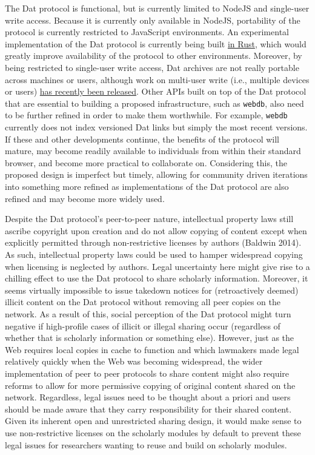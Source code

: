 \documentclass[a4paper]{article}
\begin{document}
The Dat protocol is functional, but is currently limited to NodeJS and
single-user write access. Because it is currently only available in
NodeJS, portability of the protocol is currently restricted to
JavaScript environments. An experimental implementation of the Dat
protocol is currently being built \href{https://github.com/datrs}{in
Rust}, which would greatly improve availability of the protocol to other
environments. Moreover, by being restricted to single-user write access,
Dat archives are not really portable across machines or users, although
work on multi-user write (i.e., multiple devices or users)
\href{https://github.com/mafintosh/hyperdb}{has recently been released}.
Other APIs built on top of the Dat protocol that are essential to
building a proposed infrastructure, such as \texttt{webdb}, also need to
be further refined in order to make them worthwhile. For example,
\texttt{webdb} currently does not index versioned Dat links but simply
the most recent versions. If these and other developments continue, the
benefits of the protocol will mature, may become readily available to
individuals from within their standard browser, and become more
practical to collaborate on. Considering this, the proposed design is
imperfect but timely, allowing for community driven iterations into
something more refined as implementations of the Dat protocol are also
refined and may become more widely used.

Despite the Dat protocol's peer-to-peer nature, intellectual property
laws still ascribe copyright upon creation and do not allow copying of
content except when explicitly permitted through non-restrictive
licenses by authors (Baldwin 2014). As such, intellectual property laws
could be used to hamper widespread copying when licensing is neglected
by authors. Legal uncertainty here might give rise to a chilling effect
to use the Dat protocol to share scholarly information. Moreover, it
seems virtually impossible to issue takedown notices for (retroactively
deemed) illicit content on the Dat protocol without removing all peer
copies on the network. As a result of this, social perception of the Dat
protocol might turn negative if high-profile cases of illicit or illegal
sharing occur (regardless of whether that is scholarly information or
something else). However, just as the Web requires local copies in cache
to function and which lawmakers made legal relatively quickly when the
Web was becoming widespread, the wider implementation of peer to peer
protocols to share content might also require reforms to allow for more
permissive copying of original content shared on the network.
Regardless, legal issues need to be thought about a priori and users
should be made aware that they carry responsibility for their shared
content. Given its inherent open and unrestricted sharing design, it
would make sense to use non-restrictive licenses on the scholarly
modules by default to prevent these legal issues for researchers wanting
to reuse and build on scholarly modules.
\end{document}
